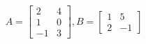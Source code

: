 \documentclass[preview]{standalone}
\begin{document}
\begin{align*}
A = \begin{bmatrix} 2 & 4 \\ 1 & 0 \\ -1 & 3 \end{bmatrix}, B = \begin{bmatrix} 1 & 5 \\ 2 & -1 \end{bmatrix}
\end{align*}
\end{document}
